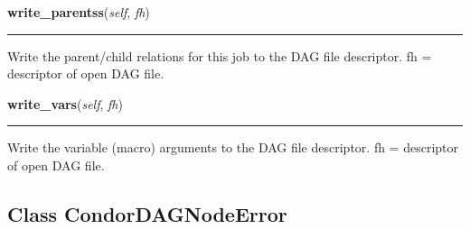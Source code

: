     \label{pipeline:CondorDAGNode:write_parentss}
    \vspace{0.5ex}

    \noindent\begin{boxedminipage}{\textwidth}

    \raggedright \textbf{write\_parentss}(\textit{self}, \textit{fh})

    \vspace{-1.5ex}

    \rule{\textwidth}{0.5\fboxrule}
    Write the parent/child relations for this job to the DAG file 
    descriptor. fh = descriptor of open DAG file.

    \vspace{1ex}

    \end{boxedminipage}

    \label{pipeline:CondorDAGNode:write_vars}
    \vspace{0.5ex}

    \noindent\begin{boxedminipage}{\textwidth}

    \raggedright \textbf{write\_vars}(\textit{self}, \textit{fh})

    \vspace{-1.5ex}

    \rule{\textwidth}{0.5\fboxrule}
    Write the variable (macro) arguments to the DAG file descriptor. fh = 
    descriptor of open DAG file.

    \vspace{1ex}

    \end{boxedminipage}



\subsection{Class CondorDAGNodeError}

